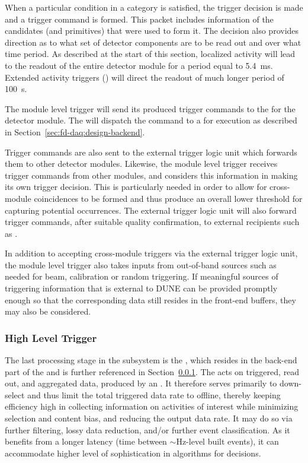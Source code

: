 When a particular condition in a category is satisfied, the trigger
decision is made and a trigger command is formed. 
This packet includes information of the candidates (and primitives)
that were used to form it. 
The decision also provides direction as to what set of detector components
are to be read out and over what time period.
As described at the start of this section, localized activity will lead
to the readout of the entire detector module for a period equal to \SI{5.4}{ms}.  Extended activity triggers () will
direct the readout of much longer period of \SI{100}{s}.

The module level trigger will send its produced trigger commands to the
 for the detector module.  The
 will dispatch the command to a  for
execution as described in Section~\ref{sec:fd-daq:design-backend}.

Trigger commands are also sent to the external trigger logic unit which
forwards them to other detector modules. Likewise, the module level
trigger receives trigger commands from other modules, and considers
this information in making its own trigger decision.
This is particularly needed in order to allow for cross-module
coincidences to be formed and thus produce an overall lower threshold for
capturing potential  occurrences. 
The external trigger logic unit will also forward  trigger
commands, after suitable quality confirmation, to external recipients
such as .

In addition to accepting cross-module triggers via the external trigger
logic unit, the module level trigger also takes inputs from out-of-band sources such as
needed for beam, calibration or random triggering. 
If meaningful sources of triggering information that is external to
DUNE can be provided promptly enough so that the corresponding data
still resides in the front-end buffers, they may also be considered.


\subsubsection{High Level Trigger}
\label{sec:fd-daq:design-data-reduction}

The last processing stage in the  subsystem is the
, which resides in the back-end part of the  and
is further referenced in Section~\ref{sec:fd-daq:design-data-reduction}.
The  acts on triggered, read out, and aggregated data,
produced by an . 
It therefore serves primarily to down-select and thus
limit the total triggered data rate to offline, thereby keeping %
efficiency high in collecting information on activities of interest
while minimizing selection and content bias, and reducing the output data
rate. It may do so via 
further filtering, lossy data reduction, and/or further event
classification. As it benefits from a longer latency (time between
$\sim$Hz-level built events), it can accommodate higher level of
sophistication in algorithms for  decisions.

